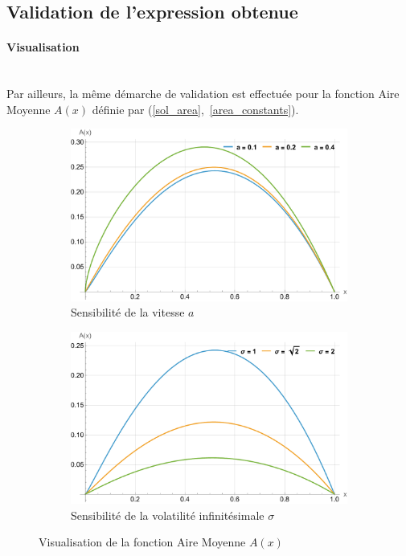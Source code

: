 \subsection{Validation de l'expression obtenue}
\paragraph{Visualisation}\phantom{}\\
Par ailleurs, la même démarche de validation est effectuée pour la fonction Aire Moyenne $A(x)$ définie par (\ref{sol_area},~\ref{area_constants}).

\begin{figure}[htb]
    \centering
    \begin{subfigure}{0.45\linewidth}
        \includegraphics[width=\linewidth]{img/validation/Area/area_a.pdf}
        \caption{Sensibilité de la vitesse $a$}\label{fig:Area_a_visualisation}
    \end{subfigure}
    \hfill
    \begin{subfigure}{0.45\linewidth}
        \includegraphics[width=\linewidth]{img/validation/Area/area_sigma.pdf}
        \caption{Sensibilité de la volatilité infinitésimale $\sigma$}\label{fig:Area_sigma_visualisation}
    \end{subfigure}
    \caption{Visualisation de la fonction Aire Moyenne $A(x)$}\label{fig:AreaVisualisation}
\end{figure}
